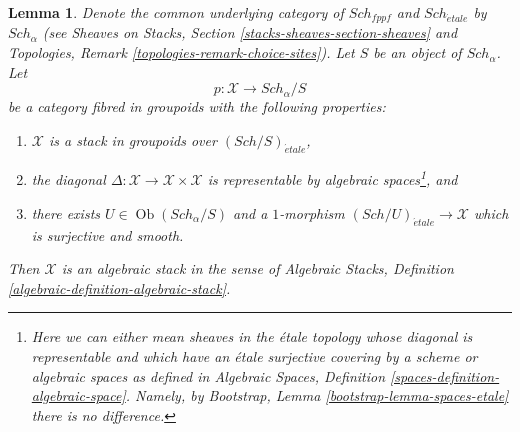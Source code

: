 \documentclass{stacks-project}
\theoremstyle{plain}
\newtheorem{lemma}[subsection]{Lemma}
\theoremstyle{definition}
\theoremstyle{remark}
\numberwithin{equation}{subsection}
\def\Sch{\mathit{Sch}}
\def\Ob{\mathop{\mathrm{Ob}}\nolimits}
\def\etale{{\acute{e}tale}}
\begin{document}
\begin{lemma}
\label{lemma-stacks-etale}
Denote the common underlying category of $\Sch_{fppf}$
and $\Sch_\etale$ by $\Sch_\alpha$ (see
Sheaves on Stacks, Section \ref{stacks-sheaves-section-sheaves} and
Topologies, Remark \ref{topologies-remark-choice-sites}). Let $S$ be an object
of $\Sch_\alpha$. Let
$$
p : \mathcal{X} \to \Sch_\alpha/S
$$
be a category fibred in groupoids with the following properties:
\begin{enumerate}
\item $\mathcal{X}$ is a stack in groupoids over $(\Sch/S)_\etale$,
\item the diagonal $\Delta : \mathcal{X} \to \mathcal{X} \times \mathcal{X}$
is representable by algebraic spaces\footnote{Here we can either mean
sheaves in the \'etale topology whose diagonal is representable and which
have an \'etale surjective covering by a scheme or algebraic spaces as
defined in
Algebraic Spaces, Definition \ref{spaces-definition-algebraic-space}.
Namely, by Bootstrap, Lemma \ref{bootstrap-lemma-spaces-etale}
there is no difference.}, and
\item there exists $U \in \Ob(\Sch_\alpha/S)$
and a $1$-morphism $(\Sch/U)_\etale \to \mathcal{X}$
which is surjective and smooth.
\end{enumerate}
Then $\mathcal{X}$ is an algebraic stack in the sense of
Algebraic Stacks, Definition \ref{algebraic-definition-algebraic-stack}.
\end{lemma}
\end{document}
